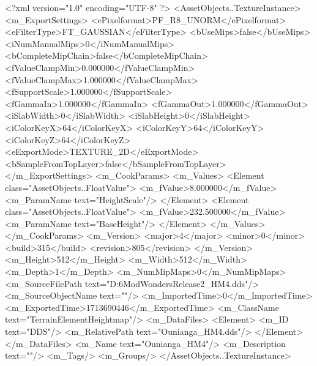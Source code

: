 <?xml version="1.0" encoding="UTF-8" ?>
<AssetObjects..TextureInstance>
	<m_ExportSettings>
		<ePixelformat>PF_R8_UNORM</ePixelformat>
		<eFilterType>FT_GAUSSIAN</eFilterType>
		<bUseMips>false</bUseMips>
		<iNumManualMips>0</iNumManualMips>
		<bCompleteMipChain>false</bCompleteMipChain>
		<fValueClampMin>0.000000</fValueClampMin>
		<fValueClampMax>1.000000</fValueClampMax>
		<fSupportScale>1.000000</fSupportScale>
		<fGammaIn>1.000000</fGammaIn>
		<fGammaOut>1.000000</fGammaOut>
		<iSlabWidth>0</iSlabWidth>
		<iSlabHeight>0</iSlabHeight>
		<iColorKeyX>64</iColorKeyX>
		<iColorKeyY>64</iColorKeyY>
		<iColorKeyZ>64</iColorKeyZ>
		<eExportMode>TEXTURE_2D</eExportMode>
		<bSampleFromTopLayer>false</bSampleFromTopLayer>
	</m_ExportSettings>
	<m_CookParams>
		<m_Values>
			<Element class="AssetObjects..FloatValue">
				<m_fValue>8.000000</m_fValue>
				<m_ParamName text="HeightScale"/>
			</Element>
			<Element class="AssetObjects..FloatValue">
				<m_fValue>232.500000</m_fValue>
				<m_ParamName text="BaseHeight"/>
			</Element>
		</m_Values>
	</m_CookParams>
	<m_Version>
		<major>4</major>
		<minor>0</minor>
		<build>315</build>
		<revision>805</revision>
	</m_Version>
	<m_Height>512</m_Height>
	<m_Width>512</m_Width>
	<m_Depth>1</m_Depth>
	<m_NumMipMaps>0</m_NumMipMaps>
	<m_SourceFilePath text="D:\Civ6Mod\Terrain\NW\Natural Wonders\TM Release2\Ounianga\Ounianga_HM4.dds"/>
	<m_SourceObjectName text=""/>
	<m_ImportedTime>0</m_ImportedTime>
	<m_ExportedTime>1713690446</m_ExportedTime>
	<m_ClassName text="TerrainElementHeightmap"/>
	<m_DataFiles>
		<Element>
			<m_ID text="DDS"/>
			<m_RelativePath text="Ounianga_HM4.dds"/>
		</Element>
	</m_DataFiles>
	<m_Name text="Ounianga_HM4"/>
	<m_Description text=""/>
	<m_Tags/>
	<m_Groups/>
</AssetObjects..TextureInstance>

